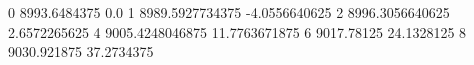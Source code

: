 0 8993.6484375 0.0
1 8989.5927734375 -4.0556640625
2 8996.3056640625 2.6572265625
4 9005.4248046875 11.7763671875
6 9017.78125 24.1328125
8 9030.921875 37.2734375
